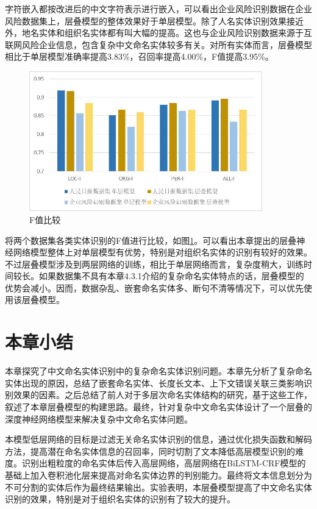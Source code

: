 \documentclass[winfonts,master,oneside,nobackinfo]{njuthesis}
\begin{document}
字符嵌入都按改进后的中文字符表示进行嵌入，可以看出企业风险识别数据在企业风险数据集上，层叠模型的整体效果好于单层模型。除了人名实体识别效果接近外，地名实体和组织名实体都有叫大幅的提高。这也与企业风险识别数据来源于互联网风险企业信息，包含复杂中文命名实体较多有关。对所有实体而言，层叠模型相比于单层模型准确率提高3.83\%，召回率提高4.00\%，F值提高3.95\%。


\begin{figure}[h]
\centering
\includegraphics[width=0.9\textwidth]{./figure/层叠模型F值比较.jpg}
\caption{F值比较}
\label{compare}
\end{figure}

将两个数据集各类实体识别的F值进行比较，如图\ref{compare}。可以看出本章提出的层叠神经网络模型整体上对单层模型有优势，特别是对组织名实体的识别有较好的效果。不过层叠模型涉及到两层网络的训练，相比于单层网络而言，复杂度稍大，训练时间较长。如果数据集不具有本章4.3.1介绍的复杂命名实体特点的话，层叠模型的优势会减小。因而，数据杂乱、嵌套命名实体多、断句不清等情况下，可以优先使用该层叠模型。


\section{本章小结}

本章探究了中文命名实体识别中的复杂命名实体识别问题。本章先分析了复杂命名实体出现的原因，总结了嵌套命名实体、长度长文本、上下文错误关联三类影响识别效果的因素。之后总结了前人对于多层次命名实体结构的研究，基于这些工作，叙述了本章层叠模型的构建思路。最终，针对复杂中文命名实体设计了一个层叠的深度神经网络模型来解决复杂中文命名实体问题。

本模型低层网络的目标是过滤无关命名实体识别的信息，通过优化损失函数和解码方法，提高潜在命名实体信息的召回率，同时切割了文本降低高层模型识别的难度。识别出粗粒度的命名实体后传入高层网络，高层网络在BiLSTM-CRF模型的基础上加入卷积池化层来提高对命名实体边界的判别能力。最终将文本信息划分为不可分割的实体后作为最终结果输出。实验表明，本层叠模型提高了中文命名实体识别的效果，特别是对于组织名实体的识别有了较大的提升。
\end{document}
